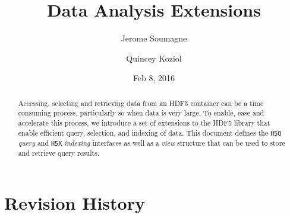 \documentclass[letterpaper,hyper]{THG_RFC}
\title{Data Analysis Extensions}
\author{Jerome Soumagne}
\author{Quincey Koziol}
\date{Feb 8, 2016}
\begin{document}
\maketitle

\begin{abstract}
Accessing, selecting and retrieving data from an HDF5 container can be a time
consuming process, particularly so when data is very large. To enable, ease and 
accelerate this process, we introduce a set of extensions to the HDF5 library
that enable efficient query, selection, and indexing of data. This document defines
the \texttt{H5Q} \textit{query} and \texttt{H5X} \textit{indexing} interfaces as
well as a \textit{view} structure that can be used to store and retrieve query results.
\end{abstract}



\section*{Revision History}
\makerevisions



\end{document}
